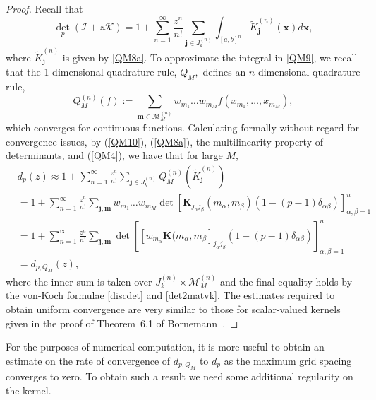 \documentclass{birkjour}
\theoremstyle{definition}
\theoremstyle{remark}
\numberwithin{equation}{section}
\begin{document}
\begin{proof}
Recall that 
\begin{equation}\label{QM9}
    {\det}_p(\mathcal{I} + z\mathcal{K})
    = 1 + \sum_{n=1}^{\infty} \frac{z^n}{n!} \sum_{\mathbf{j} \in J^{(n)}_k} \int_{[a,b]^n} \widetilde{K}^{(n)}_{\mathbf{j}}(\mathbf{x}) d\mathbf{x},
\end{equation}
where $\widetilde{K}^{(n)}_{\mathbf{j}}$ is given by \eqref{QM8a}. 
To approximate the integral in \eqref{QM9}, we recall that 
 the 1-dimensional quadrature rule, $Q_M,$  defines an $n$-dimensional quadrature rule,
\begin{equation}\label{QM10}
    Q^{(n)}_M (f) := \sum_{\mathbf{m} \in \mathcal{M}^{(n)}_M} w_{m_1} \dots w_{m_M} f(x_{m_1}, \dots, x_{m_M}),
\end{equation} 
which converges for continuous functions. 
Calculating formally without regard for convergence issues,  by (\ref{QM10}), (\ref{QM8a}), the multilinearity property of determinants, and (\ref{QM4}), we have that for large $M$,
\begin{align}
&d_p(z)  
\approx 1 + \sum_{n=1}^{\infty}\frac{z^n}{n!} \sum_{\mathbf{j}\in J^{(n)}_k} Q^{(n)}_M 
( {\widetilde K}^{(n)}_{\mathbf j})
\nonumber
 \\
&= 1 + \sum_{n=1}^{\infty}\frac{z^n}{n!} \sum_{\mathbf{j},\mathbf {m}} w_{m_1} \dots  w_{m_M} {\det}\left[  \mathbf{K}_{j_{\alpha} j_{\beta}}(m_{\alpha}, m_{\beta})(1 - (p-1)\delta_{\alpha \beta}) \right]_{\alpha, \beta = 1}^{n}
\nonumber
\\
&=1 + \sum_{n=1}^{\infty}\frac{z^n}{n!} \sum_{\mathbf{j},\mathbf {m}}  {\det}\left[  [w_{m_\alpha}\mathbf{K}(m_{\alpha}, m_{\beta}]_{j_{\alpha} j_{\beta}}(1 - (p-1)\delta_{\alpha \beta}) \right]_{\alpha, \beta = 1}^{n}
\nonumber
\\
&=d_{p,Q_M}(z),
\label{eq:dpquadderivation}
\end{align}
where the inner sum is taken over $J^{(n)}_k\times  \mathcal{M}^{(n)}_M$
and  the final equality holds by the  von-Koch formulae \eqref{discdet} and \eqref{det2matvk}. 
The estimates required to obtain uniform convergence are very similar to those 
 for scalar-valued kernels given in the proof of Theorem~6.1 of Bornemann~\cite{Bornemann}.
\end{proof} 

For the purposes of numerical computation, it is more useful to obtain an estimate
on the rate of convergence of $d_{p,Q_M}$ to $d_p$ as the maximum grid spacing
converges to zero. To obtain such a result we need some additional regularity on the kernel.
\end{document}
